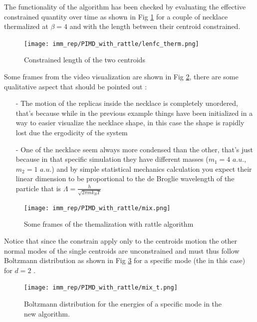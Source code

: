 \documentclass[10pt,a4paper]{article}
\begin{document}
The functionality of the algorithm has been checked by evaluating the effective constrained quantity over time as shown in Fig \ref{fig: mix} for a couple of necklace thermalized at $\beta=4$ and with the length between their centroid constrained.

 \begin{figure}[h]
	\begin{center}
		\texttt{[image: imm\_rep/PIMD\_with\_rattle/lenfc\_therm.png]}
	\end{center}
	\caption{Constrained length of the two centroids}
	\label{fig: mix}
\end{figure}

Some frames from the video visualization are shown in Fig \ref{fig: mixi}, there are some qualitative aspect that should be pointed out : 
\begin{itemize}
	\item[-] The motion of the replicas inside the necklace is completely unordered, that's because while in the previous example things have been initialized in a way to easier visualize the necklace shape, in this case the shape is rapidly lost due the ergodicity of the system
	\item[-] One of the necklace seem always more condensed than the other, that's just because in that specific simulation they have different masses ($m_1=4$ $a.u.$,$m_2=1$ $a.u.$) and by simple statistical mechanics calculation you expect their linear dimension to be proportional to the de Broglie wavelength of the particle that is $\Lambda=\frac{h}{\sqrt{2\pi mk_BT}}$
\end{itemize}

 \begin{figure}[h]
	\begin{center}
		\texttt{[image: imm\_rep/PIMD\_with\_rattle/mix.png]}
	\end{center}
	\caption{Some frames of the themalization with rattle algorithm}
	\label{fig: mixi}
\end{figure}

Notice that since the constrain apply only to the centroids motion the other normal modes of the single centroids are unconstrained and must thus follow Boltzmann distribution as shown in Fig \ref{fig: mix_t} for a specific mode (the  in this case) for $d=2$ .

 \begin{figure}[h]
	\begin{center}
		\texttt{[image: imm\_rep/PIMD\_with\_rattle/mix\_t.png]}
	\end{center}
	\caption{Boltzmann distribution for the energies of a specific mode in the new  algorithm.}
	\label{fig: mix_t}
\end{figure}
\end{document}
